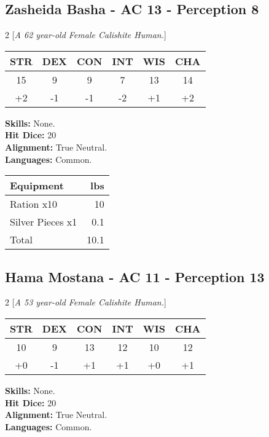 \subsection*{Zasheida Basha - AC 13 - Perception 8}
\begin{multicols}{2}
[\textit{A 62 year-old Female Calishite Human.}]
\begin{tabular}{cccccc}
 {STR}&
 {DEX}&
 {CON}&
 {INT}&
 {WIS}&
 {CHA}\\
\hline
15 & 9 & 9 & 7 & 13 & 14\\
+2 & -1 & -1 & -2 & +1 & +2
\end{tabular}
\textbf{Skills:} 
None.\\
\textbf{Hit Dice:} 20\\
\textbf{Alignment:} True Neutral.\\
\textbf{Languages:} 
Common.\\

\begin{tabular}{p{} r}
\textbf{Equipment} & lbs\\
\hline

Ration x10 & 10\\

Silver Pieces x1 & 0.1\\

\hline
Total & 10.1
\end{tabular}


\end{multicols}


\subsection*{Hama Mostana - AC 11 - Perception 13}
\begin{multicols}{2}
[\textit{A 53 year-old Female Calishite Human.}]
\begin{tabular}{cccccc}
 {STR}&
 {DEX}&
 {CON}&
 {INT}&
 {WIS}&
 {CHA}\\
\hline
10 & 9 & 13 & 12 & 10 & 12\\
+0 & -1 & +1 & +1 & +0 & +1
\end{tabular}
\textbf{Skills:} 
None.\\
\textbf{Hit Dice:} 20\\
\textbf{Alignment:} True Neutral.\\
\textbf{Languages:} 
Common.\\


\end{multicols}


